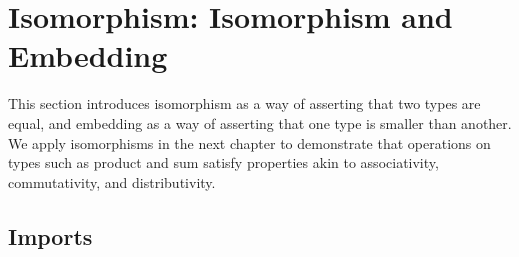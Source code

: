 \hypertarget{Isomorphism}{%
\chapter{Isomorphism: Isomorphism and Embedding}\label{Isomorphism}}

\begin{fence}
\begin{code}%
\>[0]\AgdaSpace{}%
\AgdaSpace{}%
\<%
\end{code}
\end{fence}

This section introduces isomorphism as a way of asserting that two types
are equal, and embedding as a way of asserting that one type is smaller
than another. We apply isomorphisms in the next chapter to demonstrate
that operations on types such as product and sum satisfy properties akin
to associativity, commutativity, and distributivity.

\hypertarget{imports}{%
\section{Imports}\label{imports}}

\begin{fence}
\begin{code}%
\>[0]\AgdaSpace{}%
\AgdaSpace{}%
\AgdaSpace{}%
\<%
\\
\>[0]\AgdaSpace{}%
\AgdaSpace{}%
\AgdaSpace{}%
\AgdaSymbol{(}\AgdaSymbol{;}\AgdaSpace{}%
\AgdaSymbol{;}\AgdaSpace{}%
\AgdaSymbol{;}\AgdaSpace{}%
\AgdaSymbol{)}\<%
\\
\>[0]\AgdaSpace{}%
\<%
\\
\>[0]\AgdaSpace{}%
\AgdaSpace{}%
\AgdaSpace{}%
\AgdaSpace{}%
\AgdaSymbol{(}\AgdaSymbol{;}\AgdaSpace{}%
\AgdaSymbol{;}\AgdaSpace{}%
\AgdaSymbol{;}\AgdaSpace{}%
\AgdaOperator{\AgdaPrimitive{\AgdaUnderscore{}+\AgdaUnderscore{}}}\AgdaSymbol{)}\<%
\\
\>[0]\AgdaSpace{}%
\AgdaSpace{}%
\AgdaSpace{}%
\AgdaSpace{}%
\AgdaSymbol{(}\AgdaSymbol{)}\<%
\end{code}
\end{fence}

